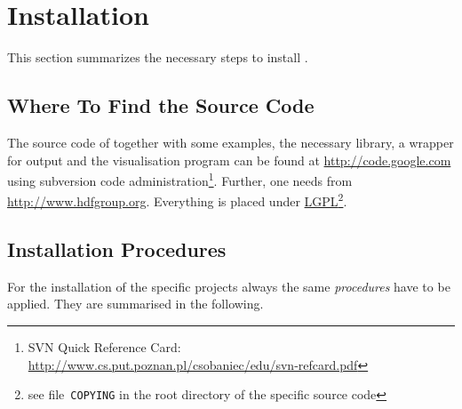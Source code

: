 \section{Installation}
This section summarizes the necessary steps to install \MBSim{}.

\subsection{Where To Find the Source Code}
The source code of \MBSim{} together with some examples, the necessary \FMatVec{} library, a \HDF{} wrapper for output and the visualisation program \OpenMBV{} can be found at \url{http://code.google.com} using subversion code administration\footnote{SVN Quick Reference Card: \url{http://www.cs.put.poznan.pl/csobaniec/edu/svn-refcard.pdf}}. Further, one needs \HDF{} from \url{http://www.hdfgroup.org}. Everything is placed under \href{http://www.gnu.org/licenses/lgpl.html}{LGPL}\footnote{see file~\texttt{COPYING} in the root directory of the specific source code}.\par

\subsection{Installation Procedures}
For the installation of the specific projects always the same \emph{procedures} have to be applied. They are summarised in the following.

